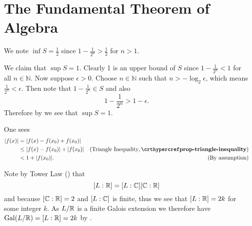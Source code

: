 \section{The Fundamental Theorem of Algebra}
\begin{questions}
    \item We note $\inf S = \frac12$ since $1 - \frac1{2^n} >
    \frac12$ for $n > 1$.

    We claim that $\sup S = 1$. Clearly 1 is an upper bound of $S$ since $1 - \frac1{2^n} < 1$ for all $n \in \mathbb{N}$. Now suppose $\epsilon > 0$. Choose $n \in \mathbb{N}$ such that $n > -\log_2\epsilon$, which means $\frac1{2^n} < \epsilon$. Then note that $1 - \frac1{2^n} \in S$ and also
    \[
        1 - \frac1{2^n} > 1 - \epsilon.
    \]
    Therefore by  we see that $\sup S = 1$.

    \item One sees
    \begin{align*}
        |f(x)| &= |f(x) - f(x_0) + f(x_0)|\\
        &\leq |f(x) - f(x_0)| + |f(x_0)| & (\text{Triangle Inequality}, \myref{prop-triangle-inequality})\\
        &< 1 + |f(x_0)|. & (\text{By assumption})
    \end{align*}

    \item Note by Tower Law () that
    \[
        [L:\mathbb{R}] = [L:\mathbb{C}][\mathbb{C}:\mathbb{R}]
    \]
    and because $[\mathbb{C}:\mathbb{R}] = 2$ and $[L:\mathbb{C}]$ is finite, thus we see that $[L:\mathbb{R}] = 2k$ for some integer $k$. As $L/\mathbb{R}$ is a finite Galois extension we therefore have $\mathrm{Gal}(L/\mathbb{R}) = [L:\mathbb{R}] = 2k$ by .


\end{questions}
